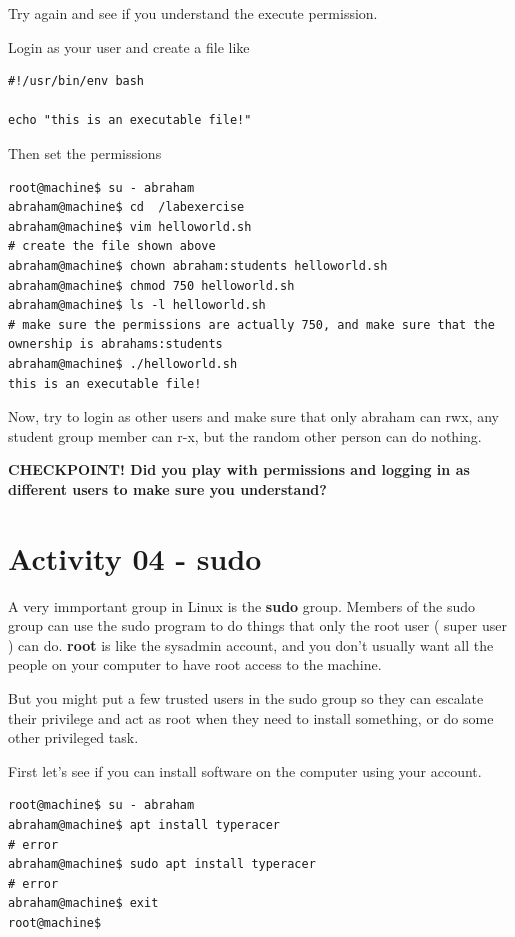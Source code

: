 \documentclass[12pt,a4]{article}
\begin{document}
Try again and see if you understand the execute permission.

Login as your user and create a file like 

\begin{lstlisting}[style=sh, caption={sample executable file: /labexercise/helloworld.sh}]
#!/usr/bin/env bash

echo "this is an executable file!"
\end{lstlisting}

Then set the permissions

\begin{lstlisting}[style=Term, label=listing:awk, caption={Create a test file}]
root@machine$ su - abraham
abraham@machine$ cd  /labexercise
abraham@machine$ vim helloworld.sh
# create the file shown above
abraham@machine$ chown abraham:students helloworld.sh
abraham@machine$ chmod 750 helloworld.sh
abraham@machine$ ls -l helloworld.sh
# make sure the permissions are actually 750, and make sure that the ownership is abrahams:students
abraham@machine$ ./helloworld.sh
this is an executable file!
\end{lstlisting}


Now, try to login as other users and make sure that only abraham can rwx, any student group member can r-x, but the random other person can do nothing.

\newpage

\textbf{CHECKPOINT! Did you play with permissions and logging in as different users to make sure you understand?}

\newpage 

\section{Activity 04 - sudo}

A very immportant group in Linux is the \textbf{sudo} group. Members of the sudo group can use the sudo program to do things that only the root user ( super user ) can do. \textbf{root} is like the sysadmin account, and you don't usually want all the people on your computer to have root access to the machine.

But you might put a few trusted users in the sudo group so they can escalate their privilege and act as root when they need to install something, or do some other privileged task.

First let's see if you can install software on the computer using your account.

\begin{lstlisting}[style=Term, label=listing:awk, caption={not allowed}]
root@machine$ su - abraham
abraham@machine$ apt install typeracer
# error
abraham@machine$ sudo apt install typeracer
# error
abraham@machine$ exit
root@machine$
\end{lstlisting}
\end{document}
